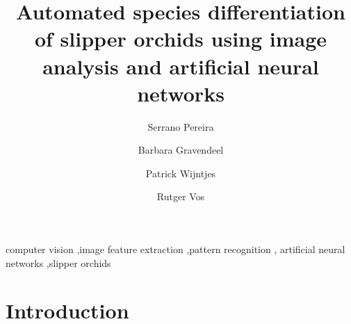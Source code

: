 \documentclass[review,3p,twocolumn]{elsarticle}
\begin{document}
\begin{frontmatter}



\title{Automated species differentiation of slipper orchids using image analysis and artificial neural networks}



\author[nbc]{Serrano Pereira}
\author[nbc,hsl]{Barbara Gravendeel}
\author[hsl]{Patrick Wijntjes}
\author[nbc]{Rutger Vos}
\address[nbc]{Naturalis Biodiversity Center, Leiden, The Netherlands}
\address[hsl]{University of Applied Sciences Leiden, Leiden, The Netherlands}

\begin{abstract}
\lipsum[1]
\end{abstract}

\begin{keyword}


computer vision \sep image feature extraction \sep pattern recognition \sep
artificial neural networks \sep slipper orchids
\end{keyword}

\end{frontmatter}


\section{Introduction}
\label{sect:introduction}
\end{document}
